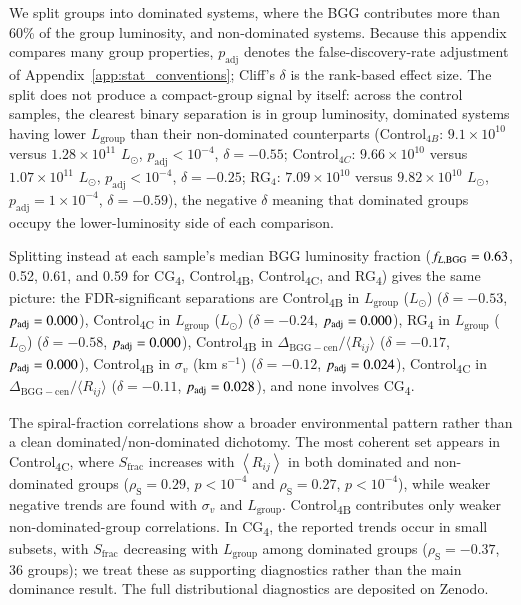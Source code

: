 \documentclass{aa}
\newcommand{\CB}{Control\textsubscript{4B}}
\newcommand{\CC}{Control\textsubscript{4C}}
\newcommand{\CG}{CG\textsubscript{4}}
\newcommand{\RG}{RG\textsubscript{4}}
\begin{document}
\begin{appendix}
We split groups into dominated systems, where the BGG contributes more than 60\% of the group luminosity, and non-dominated systems. Because this appendix compares many group properties, \(p_\mathrm{adj}\) denotes the false-discovery-rate adjustment of Appendix~\ref{app:stat_conventions}; Cliff's \(\delta\) is the rank-based effect size. The split does not produce a compact-group signal by itself: across the control samples, the clearest binary separation is in group luminosity, dominated systems having lower \(L_\mathrm{group}\) than their non-dominated counterparts (Control$_{4B}$: $9.1\times 10^{10}$ versus $1.28\times 10^{11}$ $L_\odot$, \(p_\mathrm{adj}<10^{-4}\), \(\delta=-0.55\); Control$_{4C}$: $9.66\times 10^{10}$ versus $1.07\times 10^{11}$ $L_\odot$, \(p_\mathrm{adj}<10^{-4}\), \(\delta=-0.25\); RG$_4$: $7.09\times 10^{10}$ versus $9.82\times 10^{10}$ $L_\odot$, \(p_\mathrm{adj}=1\times 10^{-4}\), \(\delta=-0.59\)), the negative \(\delta\) meaning that dominated groups occupy the lower-luminosity side of each comparison.




Splitting instead at each sample's median BGG luminosity fraction (\(f_{L,\rm BGG} = 0.63\), 0.52, 0.61, and 0.59 for \CG{}, \CB{}, \CC{}, and \RG{}) gives the same picture: the FDR-significant separations are \CB{} in  $L_\mathrm{group}$ ($L_\odot$) (\(\delta = -0.53\), \(p_{\rm adj} = 0.000\)), \CC{} in  $L_\mathrm{group}$ ($L_\odot$) (\(\delta = -0.24\), \(p_{\rm adj} = 0.000\)), \RG{} in  $L_\mathrm{group}$ ($L_\odot$) (\(\delta = -0.58\), \(p_{\rm adj} = 0.000\)), \CB{} in $\Delta_\mathrm{BGG-cen}/ \langle R_{ij} \rangle$ (\(\delta = -0.17\), \(p_{\rm adj} = 0.000\)), \CB{} in $\sigma_v$ (km s$^{-1}$) (\(\delta = -0.12\), \(p_{\rm adj} = 0.024\)), \CC{} in $\Delta_\mathrm{BGG-cen}/ \langle R_{ij} \rangle$ (\(\delta = -0.11\), \(p_{\rm adj} = 0.028\)), and none involves \CG{}.


The spiral-fraction correlations show a broader environmental pattern rather than a clean dominated/non-dominated dichotomy. The most coherent set appears in \CC, where \(S_\mathrm{frac}\) increases with \(\left\langle R_{ij}\right\rangle\) in both dominated and non-dominated groups (\(\rho_\mathrm{S}=0.29\), \(p<10^{-4}\) and \(\rho_\mathrm{S}=0.27\), \(p<10^{-4}\)), while weaker negative trends are found with \(\sigma_v\) and \(L_\mathrm{group}\). \CB{} contributes only weaker non-dominated-group correlations. In \CG, the reported trends occur in small subsets, with \(S_\mathrm{frac}\) decreasing with \(L_\mathrm{group}\) among dominated groups (\(\rho_\mathrm{S}=-0.37\), 36 groups); we treat these as supporting diagnostics rather than the main dominance result. The full distributional diagnostics are deposited on Zenodo.


\end{appendix}
\end{document}
